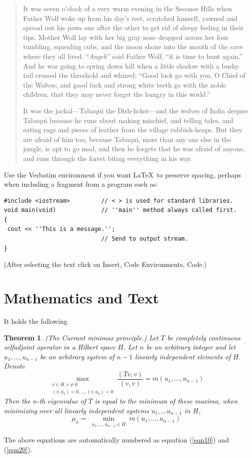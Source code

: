 \documentclass[a4paper]{book}%
\newtheorem{theorem}{Theorem}
\begin{document}
\begin{quotation}
It was seven o'clock of a very warm evening in the Seeonee Hills when Father Wolf woke
up from his day's rest, scratched himself, yawned  and spread out his paws one after
the other to get rid of sleepy feeling in their tips. Mother Wolf lay with her big gray
nose dropped across her four tumbling, squealing cubs, and the moon shone into the
mouth of the cave where they all lived. ``\emph{Augrh}'' said Father Wolf, ``it is time
to hunt again.'' And he was going to spring down hill when a little shadow with a bushy
tail crossed the threshold and whined: ``Good luck go with you, O Chief of the Wolves;
and good luck and strong white teeth go with the noble children, that they may never
forget the hungry in this world.''

It was the jackal---Tabaqui the Dish-licker---and the wolves of India despise Tabaqui
because he runs about making mischief, and telling tales, and eating rags and pieces of
leather from the village rubbish-heaps. But they are afraid of him too, because
Tabaqui, more than any one else in the jungle, is apt to go mad, and then he forgets
that he was afraid of anyone, and runs through the forest biting everything in his way.
\end{quotation}

Use the Verbatim environment if you want \LaTeX\ to preserve spacing, perhaps when
including a fragment from a program such as:
\begin{verbatim}
#include <iostream>         // < > is used for standard libraries.
void main(void)             // ''main'' method always called first.
{
 cout << ''This is a message.'';
                            // Send to output stream.
}
\end{verbatim}
(After selecting the text click on Insert, Code Environments, Code.)


\section{Mathematics and Text}

It holds \cite{KarelRektorys} the following
\begin{theorem}
(The Currant minimax principle.) Let $T$ be completely continuous selfadjoint operator
in a Hilbert space $H$. Let $n$ be an arbitrary integer and let $u_1,\ldots,u_{n-1}$ be
an arbitrary system of $n-1$ linearly independent elements of $H$. Denote
\begin{equation}
\max_{\substack{v\in H, v\neq
0\\(v,u_1)=0,\ldots,(v,u_n)=0}}\frac{(Tv,v)}{(v,v)}=m(u_1,\ldots, u_{n-1})
\label{eqn10}
\end{equation}
Then the $n$-th eigenvalue of $T$ is equal to the minimum of these maxima, when
minimizing over all linearly independent systems $u_1,\ldots u_{n-1}$ in $H$,
\begin{equation}
\mu_n = \min_{\substack{u_1,\ldots, u_{n-1}\in H}} m(u_1,\ldots, u_{n-1}) \label{eqn20}
\end{equation}
\end{theorem}
The above equations are automatically numbered as equation (\ref{eqn10}) and
(\ref{eqn20}).
\end{document}
